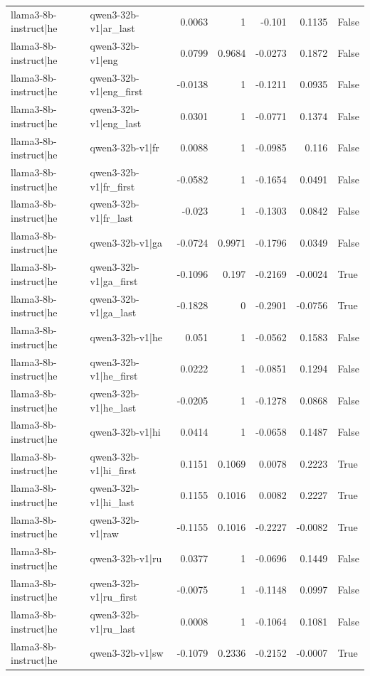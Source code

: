 \begin{table}
\begin{tabular}{l l r r r r l}
llama3-8b-instruct|he & qwen3-32b-v1|ar_last & 0.0063 & 1 & -0.101 & 0.1135 & False \\
llama3-8b-instruct|he & qwen3-32b-v1|eng & 0.0799 & 0.9684 & -0.0273 & 0.1872 & False \\
llama3-8b-instruct|he & qwen3-32b-v1|eng_first & -0.0138 & 1 & -0.1211 & 0.0935 & False \\
llama3-8b-instruct|he & qwen3-32b-v1|eng_last & 0.0301 & 1 & -0.0771 & 0.1374 & False \\
llama3-8b-instruct|he & qwen3-32b-v1|fr & 0.0088 & 1 & -0.0985 & 0.116 & False \\
llama3-8b-instruct|he & qwen3-32b-v1|fr_first & -0.0582 & 1 & -0.1654 & 0.0491 & False \\
llama3-8b-instruct|he & qwen3-32b-v1|fr_last & -0.023 & 1 & -0.1303 & 0.0842 & False \\
llama3-8b-instruct|he & qwen3-32b-v1|ga & -0.0724 & 0.9971 & -0.1796 & 0.0349 & False \\
llama3-8b-instruct|he & qwen3-32b-v1|ga_first & -0.1096 & 0.197 & -0.2169 & -0.0024 & True \\
llama3-8b-instruct|he & qwen3-32b-v1|ga_last & -0.1828 & 0 & -0.2901 & -0.0756 & True \\
llama3-8b-instruct|he & qwen3-32b-v1|he & 0.051 & 1 & -0.0562 & 0.1583 & False \\
llama3-8b-instruct|he & qwen3-32b-v1|he_first & 0.0222 & 1 & -0.0851 & 0.1294 & False \\
llama3-8b-instruct|he & qwen3-32b-v1|he_last & -0.0205 & 1 & -0.1278 & 0.0868 & False \\
llama3-8b-instruct|he & qwen3-32b-v1|hi & 0.0414 & 1 & -0.0658 & 0.1487 & False \\
llama3-8b-instruct|he & qwen3-32b-v1|hi_first & 0.1151 & 0.1069 & 0.0078 & 0.2223 & True \\
llama3-8b-instruct|he & qwen3-32b-v1|hi_last & 0.1155 & 0.1016 & 0.0082 & 0.2227 & True \\
llama3-8b-instruct|he & qwen3-32b-v1|raw & -0.1155 & 0.1016 & -0.2227 & -0.0082 & True \\
llama3-8b-instruct|he & qwen3-32b-v1|ru & 0.0377 & 1 & -0.0696 & 0.1449 & False \\
llama3-8b-instruct|he & qwen3-32b-v1|ru_first & -0.0075 & 1 & -0.1148 & 0.0997 & False \\
llama3-8b-instruct|he & qwen3-32b-v1|ru_last & 0.0008 & 1 & -0.1064 & 0.1081 & False \\
llama3-8b-instruct|he & qwen3-32b-v1|sw & -0.1079 & 0.2336 & -0.2152 & -0.0007 & True \\

\end{tabular}
\end{table}

